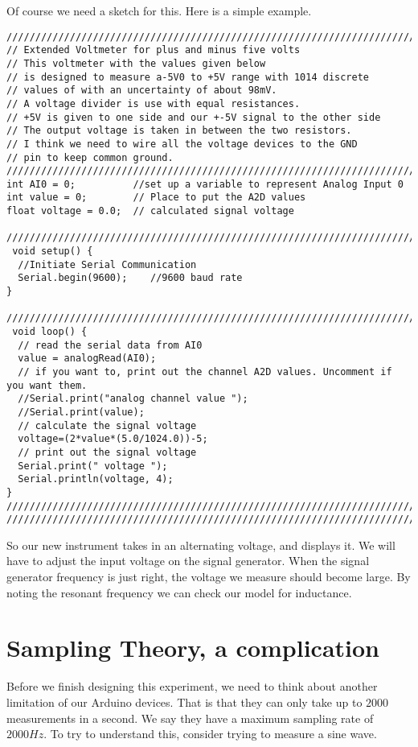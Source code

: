 Of course we need a sketch for this. Here is a simple example.
\begin{verbatim}
////////////////////////////////////////////////////////////////////////////
// Extended Voltmeter for plus and minus five volts
// This voltmeter with the values given below
// is designed to measure a-5V0 to +5V range with 1014 discrete
// values of with an uncertainty of about 98mV. 
// A voltage divider is use with equal resistances. 
// +5V is given to one side and our +-5V signal to the other side
// The output voltage is taken in between the two resistors.
// I think we need to wire all the voltage devices to the GND
// pin to keep common ground. 
////////////////////////////////////////////////////////////////////////////
int AI0 = 0;          //set up a variable to represent Analog Input 0
int value = 0;        // Place to put the A2D values
float voltage = 0.0;  // calculated signal voltage
 
////////////////////////////////////////////////////////////////////////////
 void setup() {
  //Initiate Serial Communication
  Serial.begin(9600);    //9600 baud rate
}
 
////////////////////////////////////////////////////////////////////////////
 void loop() {
  // read the serial data from AI0
  value = analogRead(AI0);
  // if you want to, print out the channel A2D values. Uncomment if you want them.
  //Serial.print("analog channel value ");
  //Serial.print(value);
  // calculate the signal voltage 
  voltage=(2*value*(5.0/1024.0))-5;
  // print out the signal voltage
  Serial.print(" voltage ");
  Serial.println(voltage, 4);  
}
////////////////////////////////////////////////////////////////////////////
////////////////////////////////////////////////////////////////////////////
\end{verbatim}

So our new instrument takes in an alternating voltage, and displays it. We
will have to adjust the input voltage on the signal generator. When the
signal generator frequency is just right, the voltage we measure should
become large. By noting the resonant frequency we can check our model for
inductance.

\section{Sampling Theory, a complication}

Before we finish designing this experiment, we need to think about another
limitation of our Arduino devices. That is that they can only take up to $%
2000$ measurements in a second. We say they have a maximum sampling rate of $%
2000\unit{Hz}.$ To try to understand this, consider trying to measure a sine
wave.

